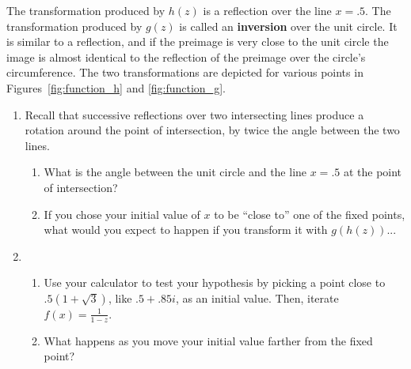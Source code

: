 \documentclass[../gatm.tex]{subfiles}
\begin{document}
\noindent The transformation produced by $h(z)$ is a reflection over the line $x=.5$. The transformation produced by $g(z)$ is called an \textbf{inversion} over the unit circle. It is similar to a reflection, and if the preimage is very close to the unit circle the image is almost identical to the reflection of the preimage over the circle's circumference. The two transformations are depicted for various points in Figures~\ref{fig:function_h} and \ref{fig:function_g}.

\begin{enumerate}
\setcounter{enumi}{\value{problem_i}}
\item Recall that successive reflections over two intersecting lines produce a rotation around the point of intersection, by twice the angle between the two lines.
\begin{enumerate}
\item What is the angle between the unit circle and the line $x=.5$ at the point of intersection?
\item If you chose your initial value of $x$ to be ``close to'' one of the fixed points, what would you expect to happen if you transform it with $g(h(z))$...
\begin{enumerate}
\end{enumerate}
\end{enumerate}
\item \begin{enumerate}
\item Use your calculator to test your hypothesis by picking a point close to $.5(1+\sqrt{3})$, like $.5+.85i$, as an initial value. Then, iterate $f(x)=\frac{1}{1-z}$.
\item What happens as you move your initial value farther from the fixed point?
\end{enumerate}
\setcounter{problem_i}{\value{enumi}}
\end{enumerate}
\end{document}
